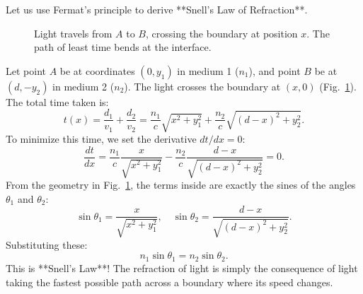 Let us use Fermat's principle to derive **Snell's Law of Refraction**.

\begin{figure}[H]
\centering
{}
\caption{Light travels from $A$ to $B$, crossing the boundary at position $x$. The path of least time bends at the interface.}
\label{fig:fermat_proof}
\end{figure}

Let point $A$ be at coordinates $(0, y_1)$ in medium 1 ($n_1$), and point $B$ be at $(d, -y_2)$ in medium 2 ($n_2$). The light crosses the boundary at $(x, 0)$ (Fig.~\ref{fig:fermat_proof}).
The total time taken is:
\begin{equation}
    t(x) = \frac{d_1}{v_1} + \frac{d_2}{v_2} = \frac{n_1}{c}\sqrt{x^2 + y_1^2} + \frac{n_2}{c}\sqrt{(d-x)^2 + y_2^2}.
\end{equation}
To minimize this time, we set the derivative $dt/dx = 0$:
\begin{equation}
    \frac{dt}{dx} = \frac{n_1}{c}\frac{x}{\sqrt{x^2 + y_1^2}} - \frac{n_2}{c}\frac{d-x}{\sqrt{(d-x)^2 + y_2^2}} = 0.
\end{equation}
From the geometry in Fig.~\ref{fig:fermat_proof}, the terms inside are exactly the sines of the angles $\theta_1$ and $\theta_2$:
\begin{equation}
    \sin\theta_1 = \frac{x}{\sqrt{x^2 + y_1^2}}, \quad \sin\theta_2 = \frac{d-x}{\sqrt{(d-x)^2 + y_2^2}}.
\end{equation}
Substituting these:
\begin{equation}
    n_1 \sin\theta_1 = n_2 \sin\theta_2.
\end{equation}
This is **Snell's Law**! The refraction of light is simply the consequence of light taking the fastest possible path across a boundary where its speed changes.

